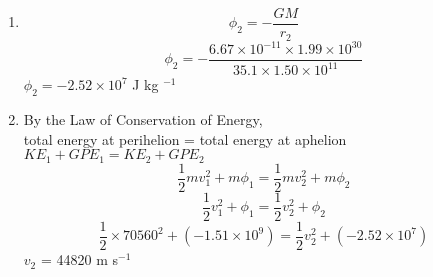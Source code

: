 \documentclass[a4paper,12pt]{article}
\begin{document}
\begin{enumerate}
\begin{enumerate}
\item
\[\phi_2 = -\frac{GM}{r_2}  \]
\[\phi_2 = -\frac{6.67 \times 10^{-11} \times 1.99 \times 10^{30}}{35.1 \times 1.50 \times 10^{11}}  \]
$ \phi_2 = -2.52 \times 10^7 $ J kg $^{-1}$ \\

\item
By the Law of Conservation of Energy,\\
total energy at perihelion = total energy at aphelion \\
$KE_1 + GPE_1 = KE_2 + GPE_2 $\\
\[ \frac{1}{2}mv_1^2 + m \phi_1 =  \frac{1}{2}mv_2^2 + m \phi_2   \]
\[ \frac{1}{2}v_1^2 + \phi_1 =  \frac{1}{2}v_2^2 + \phi_2   \]
\[ \frac{1}{2}\times 70560^2 + (-1.51 \times 10^9) =  \frac{1}{2}v_2^2 + (-2.52 \times 10^7)   \]
$ v_2$ = 44820 m s$^{-1}$ \\

\end{enumerate}

\end{enumerate}
\end{document}
